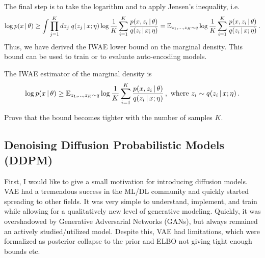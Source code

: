 The final step is to take the logarithm and to apply Jensen's inequality, i.e.
\begin{align}
    \log p(x\,|\, \theta) \geq  \int \prod_{j=1}^K dz_j\; q(z_j\,|\, x;\eta)\log \frac{1}{K}\sum_{i=1}^K\frac{p(x,z_i\,|\,\theta)}{q(z_i\,|\, x;\eta)} = \mathbb{E}_{z_1,\ldots,z_K \sim q}\log \frac{1}{K}\sum_{i=1}^K\frac{p(x,z_i\,|\,\theta)}{q(z_i\,|\, x;\eta)}\,.
\end{align}
Thus, we have derived the IWAE lower bound on the marginal density. This bound can be used to train or to evaluate auto-encoding models.

\begin{proposition}
    The IWAE estimator of the marginal density is
    \begin{align}
        \log p(x\,|\, \theta) \geq \mathbb{E}_{z_1,\ldots,z_K \sim q}\log \frac{1}{K}\sum_{i=1}^K\frac{p(x,z_i\,|\,\theta)}{q(z_i\,|\, x;\eta)}\,, \text{ where } z_i \sim q(z_i\,|\, x;\eta)\,.
    \end{align}
\end{proposition}

\begin{exercise}
    Prove that the bound becomes tighter with the number of samples $K$.
\end{exercise}

\subsection{Denoising Diffusion Probabilistic Models (DDPM) \citep{sohl2015deep}}

First, I would like to give a small motivation for introducing diffusion models. VAE had a tremendous success in the ML/DL community and quickly started spreading to other fields. It was very simple to understand, implement, and train while allowing for a qualitatively new level of generative modeling. Quickly, it was overshadowed by Generative Adversarial Networks (GANs), but always remained an actively studied/utilized model. Despite this, VAE had limitations, which were formalized as posterior collapse to the prior and ELBO not giving tight enough bounds etc.


